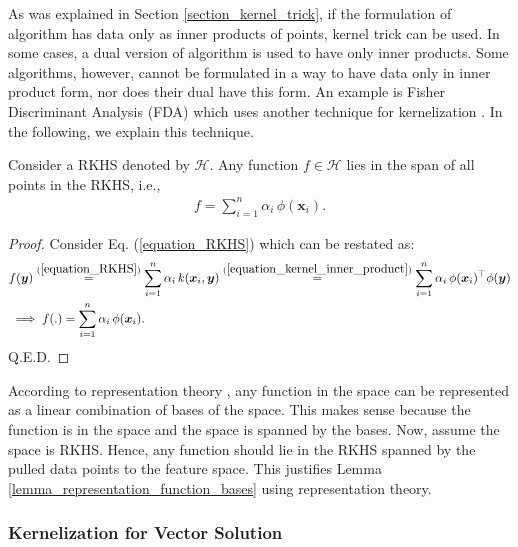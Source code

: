 \documentclass[lang=cn,10pt]{gorgeousnbook}
\numberwithin{equation}{section}%
\numberwithin{figure}{section}%
\begin{document}
As was explained in Section \ref{section_kernel_trick}, if the formulation of algorithm has data only as inner products of points, kernel trick can be used. In some cases, a dual version of algorithm is used to have only inner products. 
Some algorithms, however, cannot be formulated in a way to have data only in inner product form, nor does their dual have this form. An example is Fisher Discriminant Analysis (FDA) \cite{ghojogh2019fisher} which uses another technique for kernelization \cite{mika1999fisher}. In the following, we explain this technique. 

\begin{lemma}\label{lemma_representation_function_bases}
Consider a RKHS denoted by $\mathcal{H}$. Any function $f \in \mathcal{H}$ lies in the span of all points in the RKHS, i.e.,
\begin{align}
f = \sum_{i=1}^n \alpha_i\, \phi(\boldsymbol{x}_i).
\end{align}
\end{lemma}
\begin{proof}
Consider Eq. (\ref{equation_RKHS}) which can be restated as:
\begin{align*}
&f(\boldsymbol{y}) \overset{(\ref{equation_RKHS})}{=} \sum_{i=1}^n \alpha_i\, k(\boldsymbol{x}_i, \boldsymbol{y}) \overset{(\ref{equation_kernel_inner_product})}{=} \sum_{i=1}^n \alpha_i\, \phi(\boldsymbol{x}_i)^\top \phi(\boldsymbol{y}) \\
&\implies f(.) = \sum_{i=1}^n \alpha_i\, \phi(\boldsymbol{x}_i).
\end{align*}
Q.E.D.
\end{proof}

\begin{remark}
According to representation theory \cite{alperin1993local}, any function in the space can be represented as a linear combination of bases of the space. This makes sense because the function is in the space and the space is spanned by the bases. Now, assume the space is RKHS. Hence, any function should lie in the RKHS spanned by the pulled data points to the feature space. This justifies Lemma \ref{lemma_representation_function_bases} using representation theory. 
\end{remark}

\subsubsection{Kernelization for Vector Solution}
\end{document}
